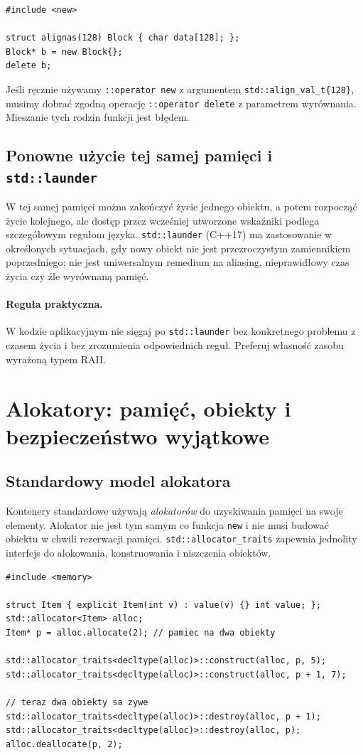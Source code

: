 \begin{lstlisting}
#include <new>

struct alignas(128) Block { char data[128]; };
Block* b = new Block{};
delete b;
\end{lstlisting}

Jeśli ręcznie używamy \texttt{::operator new} z argumentem
\texttt{std::align\_val\_t\{128\}}, musimy dobrać zgodną operację
\texttt{::operator delete} z parametrem wyrównania. Mieszanie tych
rodzin funkcji jest błędem.

\subsection{Ponowne użycie tej samej pamięci i \texttt{std::launder}}

W tej samej pamięci można zakończyć życie jednego obiektu, a potem
rozpocząć życie kolejnego, ale dostęp przez wcześniej utworzone
wskaźniki podlega szczegółowym regułom języka. \texttt{std::launder}
(C++17) ma zastosowanie w określonych sytuacjach, gdy nowy obiekt
nie jest przezroczystym zamiennikiem poprzedniego; nie jest
uniwersalnym remedium na aliasing, nieprawidłowy czas życia
czy źle wyrównaną pamięć.

\paragraph{Reguła praktyczna.}
W kodzie aplikacyjnym nie sięgaj po \texttt{std::launder} bez
konkretnego problemu z czasem życia i bez zrozumienia odpowiednich
reguł. Preferuj własność zasobu wyrażoną typem RAII.

\section{Alokatory: pamięć, obiekty i bezpieczeństwo wyjątkowe}
\label{sec:cpp10-allocators}

\subsection{Standardowy model alokatora}

Kontenery standardowe używają \emph{alokatorów} do uzyskiwania
pamięci na swoje elementy. Alokator nie jest tym samym co funkcja
\texttt{new} i nie musi budować obiektu w chwili rezerwacji pamięci.
\texttt{std::allocator\_traits} zapewnia jednolity interfejs do
alokowania, konstruowania i niszczenia obiektów.

\begin{lstlisting}
#include <memory>

struct Item { explicit Item(int v) : value(v) {} int value; };
std::allocator<Item> alloc;
Item* p = alloc.allocate(2); // pamiec na dwa obiekty

std::allocator_traits<decltype(alloc)>::construct(alloc, p, 5);
std::allocator_traits<decltype(alloc)>::construct(alloc, p + 1, 7);

// teraz dwa obiekty sa zywe
std::allocator_traits<decltype(alloc)>::destroy(alloc, p + 1);
std::allocator_traits<decltype(alloc)>::destroy(alloc, p);
alloc.deallocate(p, 2);
\end{lstlisting}

